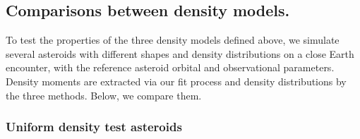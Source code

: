 \documentclass[fleqn,usenatbib]{mnras}
\begin{document}
\subsection{Comparisons between density models.}
\label{sec:density-compare}

To test the properties of the three density models defined above, we simulate several asteroids with different shapes and density distributions on a close Earth encounter, with the reference asteroid orbital and observational parameters. Density moments are extracted via our fit process and density distributions by the three methods. Below, we compare them.

\subsubsection{Uniform density test asteroids}
\end{document}
